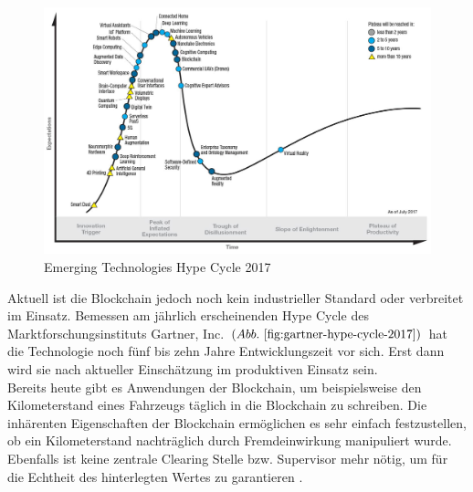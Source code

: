 \begin{figure}[h!]
	\centering
	\includegraphics[width=0.65\linewidth]{pictures/Gartner-Hype-Cycle-2017}
	\caption[Gartner Hype Cycle 2017]{Emerging Technologies Hype Cycle 2017\citep{Gartner2017}}
	\label{fig:gartner-hype-cycle-2017}
\end{figure}

Aktuell ist die Blockchain jedoch noch kein industrieller Standard oder verbreitet im Einsatz. Bemessen am jährlich erscheinenden Hype Cycle des Marktforschungsinstituts Gartner, Inc. $( Abb.~ \ref{fig:gartner-hype-cycle-2017} )$ hat die Technologie noch fünf bis zehn Jahre Entwicklungszeit vor sich. Erst dann wird sie nach aktueller Einschätzung im produktiven Einsatz sein.\\

Bereits heute gibt es Anwendungen der Blockchain, um beispielsweise den Kilometerstand eines Fahrzeugs täglich \glqq in die Blockchain\grqq{} zu schreiben. Die inhärenten Eigenschaften der Blockchain ermöglichen es sehr einfach festzustellen, ob ein Kilometerstand nachträglich durch Fremdeinwirkung manipuliert wurde. Ebenfalls ist keine zentrale \glqq Clearing Stelle\grqq{} bzw. Supervisor mehr nötig, um für die Echtheit des hinterlegten Wertes zu garantieren \citep{carVertical}.\\


